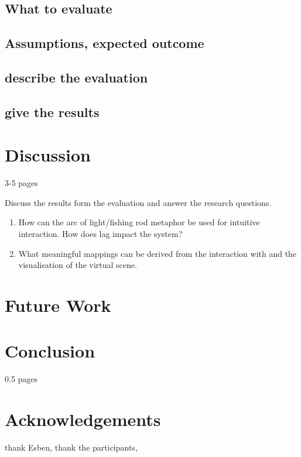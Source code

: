 \documentclass[10pt,a4paper]{scrartcl}
\begin{document}
\subsection{What to evaluate}
\subsection{Assumptions, expected outcome}
\subsection{describe the evaluation}
\subsection{give the results}


\section{Discussion}
\label{sec:discussion}
3-5 pages

Discuss the results form the evaluation and answer the research questions. 

\begin{enumerate}
\item How can the arc of light/fishing rod metaphor be used for intuitive interaction. How does lag impact the system?
\item What meaningful mappings can be derived from the interaction with and the visualisation of the virtual scene.
\end{enumerate}

\section{Future Work}

\section{Conclusion}
0.5 pages

\section{Acknowledgements}
thank Esben, thank the participants,






\end{document}

